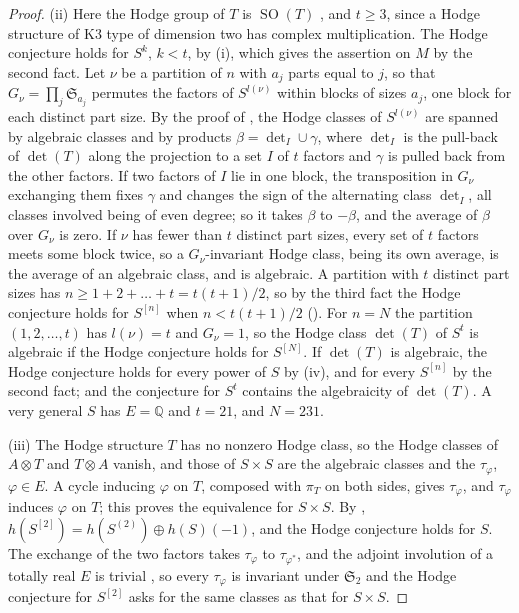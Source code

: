 \documentclass[11pt,reqno]{amsart}
\theoremstyle{plain}
\theoremstyle{definition}
\theoremstyle{remark}
\newcommand{\QQ}{\mathbb{Q}}
\DeclareMathOperator{\SO}{SO}
\begin{document}
\begin{proof}
(ii) Here the Hodge group of $T$ is $\SO(T)$ \cite{Zar83}, and $t\ge3$,
since a Hodge structure of K3 type of dimension two has complex
multiplication. The Hodge conjecture holds for $S^{k}$, $k<t$, by
(i), which gives the assertion on $M$ by the second
fact. Let $\nu$ be a partition of $n$ with $a_{j}$ parts equal to $j$, so
that $G_{\nu}=\prod_{j}\mathfrak{S}_{a_{j}}$ permutes the factors of
$S^{l(\nu)}$ within blocks of sizes $a_{j}$, one block for each distinct part
size. By the proof of , the Hodge classes of
$S^{l(\nu)}$ are spanned by algebraic classes and by products
$\beta=\det_{I}\cup\gamma$, where $\det_{I}$ is the pull-back of $\det(T)$
along the projection to a set $I$ of $t$ factors and $\gamma$ is pulled back
from the other factors. If two factors of $I$ lie in one block, the
transposition in $G_{\nu}$ exchanging them fixes $\gamma$ and changes the
sign of the alternating class $\det_{I}$, all classes involved being of even
degree; so it takes $\beta$ to $-\beta$, and the average of $\beta$ over
$G_{\nu}$ is zero. If $\nu$ has fewer than $t$ distinct part sizes, every set
of $t$ factors meets some block twice, so a $G_{\nu}$-invariant Hodge class,
being its own average, is the average of an algebraic class, and is
algebraic. A partition with $t$ distinct part sizes has
$n\ge1+2+\dots+t=t(t+1)/2$, so by the third fact the Hodge conjecture holds
for $S^{[n]}$ when $n<t(t+1)/2$ (). For $n=N$ the
partition $(1,2,\dots,t)$ has
$l(\nu)=t$ and $G_{\nu}=1$, so the Hodge class $\det(T)$ of $S^{t}$ is
algebraic if the Hodge conjecture holds for $S^{[N]}$. If $\det(T)$ is
algebraic, the Hodge conjecture holds for every power of $S$ by
(iv), and for every $S^{[n]}$ by the second fact; and
the conjecture for $S^{t}$ contains the algebraicity of $\det(T)$. A very
general $S$ has $E=\QQ$ and $t=21$, and $N=231$.

(iii) The Hodge structure $T$ has no nonzero Hodge class, so the Hodge
classes of $A\otimes T$ and $T\otimes A$ vanish, and those of $S\times S$
are the algebraic classes and the $\tau_{\varphi}$, $\varphi\in E$. A cycle
inducing $\varphi$ on $T$, composed with $\pi_{T}$ on both sides, gives
$\tau_{\varphi}$, and $\tau_{\varphi}$ induces $\varphi$ on $T$; this proves
the equivalence for $S\times S$. By \cite{dCM02},
$h(S^{[2]})=h(S^{(2)})\oplus h(S)(-1)$, and the Hodge conjecture holds for
$S$. The exchange of the two factors takes $\tau_{\varphi}$ to
$\tau_{\varphi^{*}}$, and the adjoint involution of a totally real $E$ is
trivial \cite{Zar83}, so every $\tau_{\varphi}$ is invariant under
$\mathfrak{S}_{2}$ and the Hodge conjecture for $S^{[2]}$ asks for the same
classes as that for $S\times S$.
\end{proof}
\end{document}
